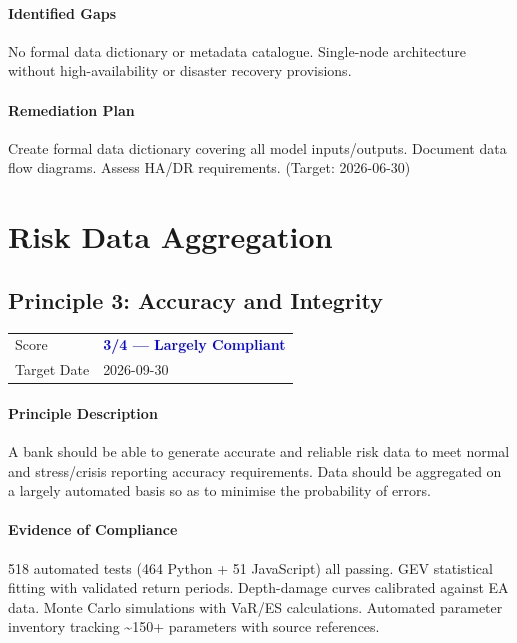\documentclass[11pt]{article}
\begin{document}
\paragraph{Identified Gaps}
No formal data dictionary or metadata catalogue. Single-node architecture without high-availability or disaster recovery provisions.

\paragraph{Remediation Plan}
Create formal data dictionary covering all model inputs/outputs. Document data flow diagrams. Assess HA/DR requirements. (Target: 2026-06-30)

\clearpage

\section{Risk Data Aggregation}

\subsection{Principle 3: Accuracy and Integrity}

\begin{table}[H]
    \centering
    \begin{tabular}{ll}
        \toprule
        Score & \textcolor{blue}{\textbf{3/4 --- Largely Compliant}} \\
        Target Date & 2026-09-30 \\
        \bottomrule
    \end{tabular}
\end{table}

\paragraph{Principle Description}
A bank should be able to generate accurate and reliable risk data to meet normal and stress/crisis reporting accuracy requirements. Data should be aggregated on a largely automated basis so as to minimise the probability of errors.

\paragraph{Evidence of Compliance}
518 automated tests (464 Python + 51 JavaScript) all passing. GEV statistical fitting with validated return periods. Depth-damage curves calibrated against EA data. Monte Carlo simulations with VaR/ES calculations. Automated parameter inventory tracking \textasciitilde{}150+ parameters with source references.
\end{document}
